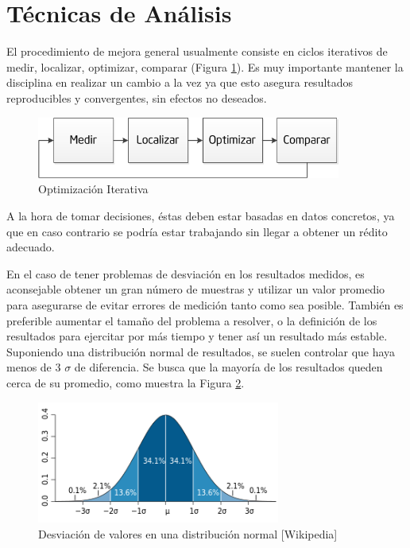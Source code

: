 \documentclass[a4paper]{report}
\begin{document}
\section{Técnicas de Análisis}

El procedimiento de mejora general usualmente consiste en ciclos iterativos de medir, localizar, optimizar,
comparar (Figura \ref{fig:cycle}). Es muy importante mantener la disciplina en realizar un cambio a la
vez ya que esto asegura resultados reproducibles y convergentes, sin efectos no deseados.

\begin{figure}[H]
\begin{center}
\includegraphics[width=10cm]{cycle.png}
\caption{Optimización Iterativa}
\label{fig:cycle}
\end{center}
\end{figure}

A la hora de tomar decisiones, éstas deben estar basadas en datos concretos, ya que en caso contrario se podría estar trabajando sin llegar a obtener un rédito adecuado.

\bigskip

En el caso de tener problemas de desviación en los resultados medidos, es aconsejable obtener un gran número de muestras y utilizar un valor promedio para asegurarse de evitar errores de medición tanto como sea posible. También es preferible aumentar el tamaño del problema a resolver, o la definición de los resultados para ejercitar por más tiempo y tener así un resultado más estable.
Suponiendo una distribución normal de resultados, se suelen controlar que haya menos de 3 $ \sigma $ de diferencia. Se busca que la mayoría de los resultados queden cerca de su promedio, como muestra la Figura \ref{fig:deviation}.

\begin{figure}[H]
\label{fig:deviation}
\begin{center}
\includegraphics[width=8cm]{deviation.png}
\caption{Desviación de valores en una distribución normal [Wikipedia]}
\end{center}
\end{figure}
\end{document}
